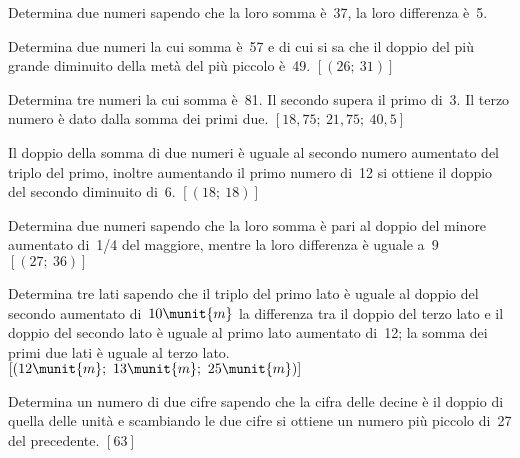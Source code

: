 \newpage
\begin{htmulticols}{2}
\begin{esercizio}
 \label{ese:22.77}
Determina due numeri sapendo che la loro somma è~37, la loro
differenza è~5.
\end{esercizio}

\begin{esercizio}[]
 \label{ese:22.81}
Determina due numeri la cui somma è~57 e di cui si sa che il doppio del più 
grande diminuito della metà del più piccolo è~49.
\hfill \(\left[(26;~31)\right]\)
\end{esercizio}

\begin{esercizio}[*]
 \label{ese:22.79}
Determina tre numeri la cui somma è~81. Il secondo supera il primo
di~3. Il terzo numero è dato dalla somma dei primi due. 
\hfill \(\left[18,75;~21,75;~40,5\right]\)
\end{esercizio}

\begin{esercizio}[*]
 \label{ese:22.78}
Il doppio della somma di due numeri è uguale al secondo numero aumentato
del triplo del primo, inoltre aumentando il primo numero di~12 si
ottiene il doppio del secondo diminuito di~6. 
\hfill \(\left[(18;~18)\right]\)
\end{esercizio}

\begin{esercizio}[*]
 \label{ese:22.80}
Determina due numeri sapendo che la loro somma è pari al doppio del minore 
aumentato di~1/4
del maggiore, mentre la loro differenza è uguale a~\(9\)
\hfill \(\left[(27;~36)\right]\)
\end{esercizio}

\begin{esercizio}[*]
 \label{ese:22.82}
Determina tre lati sapendo che il triplo del primo lato è
uguale al doppio del secondo aumentato di~\(10\munit{m}\) la differenza 
tra il doppio del terzo lato e il doppio del secondo lato è uguale al 
primo lato aumentato di~12; la somma dei primi due lati è uguale al terzo
lato.
\hfill \(\left[(12\munit{m};~13\munit{m};~25\munit{m})\right]\)
\end{esercizio}

\begin{esercizio}[*]
 \label{ese:22.83}
Determina un numero di due cifre sapendo che la cifra delle decine
è il doppio di quella delle unità e scambiando le due cifre si
ottiene un numero più piccolo di~27 del precedente.
\hfill \(\left[63\right]\)
\end{esercizio}


\end{htmulticols}
